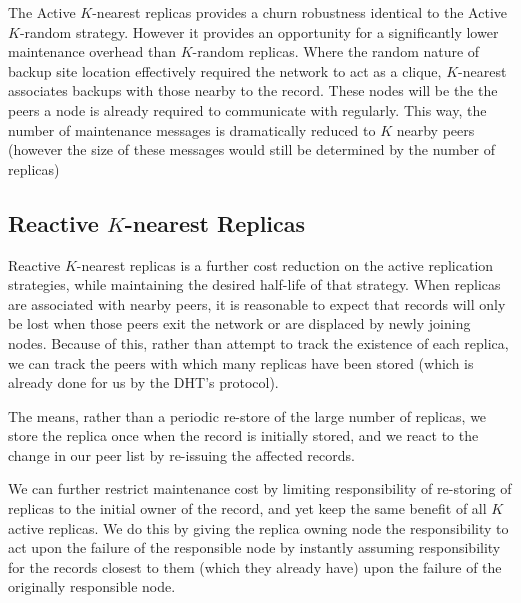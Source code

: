 	The Active $K$-nearest replicas provides a churn robustness identical to the Active $K$-random strategy.
	However it provides an opportunity for a significantly lower maintenance overhead than $K$-random replicas.
	Where the random nature of backup site location effectively required the network to act as a clique, $K$-nearest associates backups with those nearby to the record.
	These nodes will be the  the peers a node is already required to communicate with regularly.
	This way, the number of maintenance messages is dramatically reduced to $K$ nearby peers (however the size of these messages would still be determined by the number of replicas)
	
	\subsection{Reactive $K$-nearest Replicas}
	Reactive $K$-nearest replicas is a further cost reduction on the active replication strategies, while maintaining the desired half-life of that strategy.
	When replicas are associated with nearby peers, it is reasonable to expect that records will only be lost when those peers exit the network or are displaced by newly joining nodes.
	Because of this, rather than attempt to track the existence of each replica, we can track the peers with which many replicas have been stored (which is already done for us by the DHT's protocol).
	
	The means, rather than a periodic re-store of the large number of replicas, we store the replica once when the record is initially stored, and we react to the change in our peer list by re-issuing the affected records.
	
	We can further restrict maintenance cost by limiting responsibility of re-storing of replicas to the initial owner of the record, and yet keep the same benefit of all $K$ active replicas.
	We do this by giving the replica owning node the responsibility to act upon the failure of the responsible node by instantly assuming responsibility for the records closest to them (which they already have) upon the failure of the originally responsible node.
	
	
